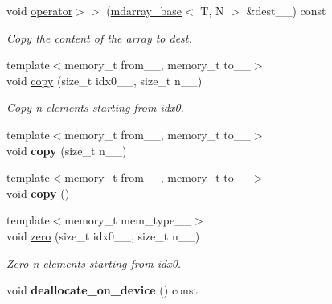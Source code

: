 \begin{DoxyCompactItemize}
\item 
void \hyperlink{classsddk_1_1mdarray__base_a3c10109122eae6ed4ef57a8cca84ee56}{operator$>$$>$} (\hyperlink{classsddk_1_1mdarray__base}{mdarray\+\_\+base}$<$ T, N $>$ \&dest\+\_\+\+\_\+) const 
\begin{DoxyCompactList}\small\item\em Copy the content of the array to dest. \end{DoxyCompactList}\item 
{\footnotesize template$<$memory\+\_\+t from\+\_\+\+\_\+, memory\+\_\+t to\+\_\+\+\_\+$>$ }\\void \hyperlink{classsddk_1_1mdarray__base_abeeda09b40f0f745873efd59380b26af}{copy} (size\+\_\+t idx0\+\_\+\+\_\+, size\+\_\+t n\+\_\+\+\_\+)
\begin{DoxyCompactList}\small\item\em Copy n elements starting from idx0. \end{DoxyCompactList}\item 
\hypertarget{classsddk_1_1mdarray__base_ae30065d17182a5aa8dc170e84d4a8215}{}{\footnotesize template$<$memory\+\_\+t from\+\_\+\+\_\+, memory\+\_\+t to\+\_\+\+\_\+$>$ }\\void {\bfseries copy} (size\+\_\+t n\+\_\+\+\_\+)\label{classsddk_1_1mdarray__base_ae30065d17182a5aa8dc170e84d4a8215}

\item 
\hypertarget{classsddk_1_1mdarray__base_a5c6cf3c73891bbea93bf0a5eab26cd60}{}{\footnotesize template$<$memory\+\_\+t from\+\_\+\+\_\+, memory\+\_\+t to\+\_\+\+\_\+$>$ }\\void {\bfseries copy} ()\label{classsddk_1_1mdarray__base_a5c6cf3c73891bbea93bf0a5eab26cd60}

\item 
{\footnotesize template$<$memory\+\_\+t mem\+\_\+type\+\_\+\+\_\+$>$ }\\void \hyperlink{classsddk_1_1mdarray__base_a3722b90ee023b4c0eac29ce28ac8aa7d}{zero} (size\+\_\+t idx0\+\_\+\+\_\+, size\+\_\+t n\+\_\+\+\_\+)
\begin{DoxyCompactList}\small\item\em Zero n elements starting from idx0. \end{DoxyCompactList}\item 
\hypertarget{classsddk_1_1mdarray__base_a812a0a6da4ea900f89f9ea737d4330c0}{}void {\bfseries deallocate\+\_\+on\+\_\+device} () const \label{classsddk_1_1mdarray__base_a812a0a6da4ea900f89f9ea737d4330c0}


\end{DoxyCompactItemize}
